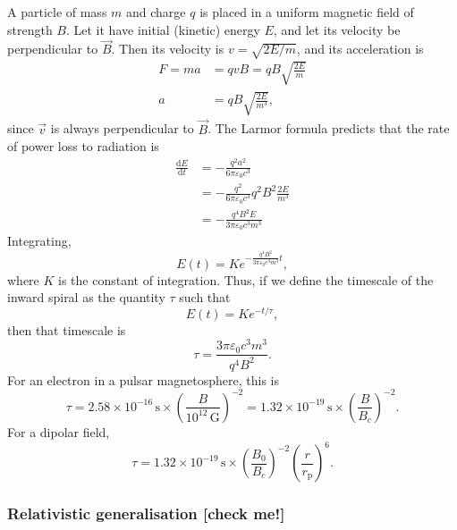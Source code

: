 \documentclass{book}
\newcommand{\deriv}[2]{\frac{\text{d}{#1}}{\text{d}{#2}}}
\newcommand{\rp}{r_\text{p}} %
\begin{document}
A particle of mass $m$ and charge $q$ is placed in a uniform magnetic field of strength $B$.
Let it have initial (kinetic) energy $E$, and let its velocity be perpendicular to $\vec{B}$.
Then its velocity is $v = \sqrt{2E/m}$, and its acceleration is
\begin{equation}
\begin{aligned}
    F = ma &= qvB = qB\sqrt{\frac{2E}{m}} \\
    a &= qB\sqrt{\frac{2E}{m^3}},
\end{aligned}
\end{equation}
since $\vec{v}$ is always perpendicular to $\vec{B}$.
The Larmor formula predicts that the rate of power loss to radiation is
\begin{equation}
\begin{aligned}
    \deriv{E}{t} &= -\frac{q^2a^2}{6\pi\varepsilon_0 c^3} \\
    &= -\frac{q^2}{6\pi\varepsilon_0 c^3} q^2 B^2 \frac{2E}{m^3} \\
    &= -\frac{q^4 B^2 E}{3\pi\varepsilon_0 c^3 m^3}
\end{aligned}
\end{equation}
Integrating,
\begin{equation}
    E(t) = K e^{-\frac{q^4 B^2}{3\pi\varepsilon_0 c^3 m^3}t},
\end{equation}
where $K$ is the constant of integration. Thus, if we define the timescale of the inward spiral as the quantity $\tau$ such that
\begin{equation}
    E(t) = Ke^{-t/\tau},
\end{equation}
then that timescale is
\begin{equation}
    \tau = \frac{3\pi\varepsilon_0 c^3 m^3}{q^4 B^2}.
\end{equation}
For an electron in a pulsar magnetosphere, this is
\begin{equation}
    \tau = 2.58 \times 10^{-16}\,\text{s} \times \left(\frac{B}{10^{12}\,\text{G}}\right)^{-2}
         = 1.32 \times 10^{-19}\,\text{s} \times \left(\frac{B}{B_c}\right)^{-2}.
\end{equation}
For a dipolar field,
\begin{equation}
    \tau = 1.32 \times 10^{-19}\,\text{s} \times \left(\frac{B_0}{B_c}\right)^{-2} \left(\frac{r}{\rp}\right)^6.
\end{equation}

\subsubsection{Relativistic generalisation [check me!]}
\end{document}
